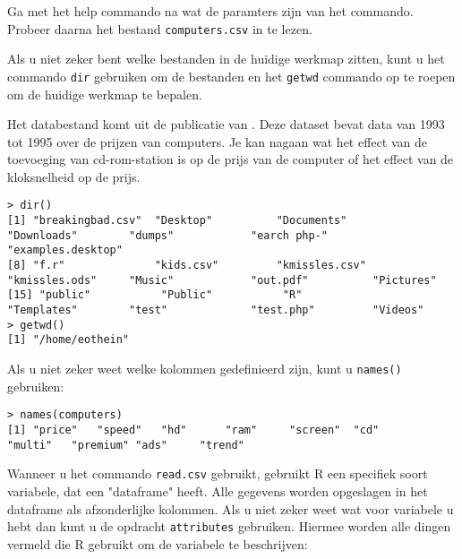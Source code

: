\begin{exercise}
	Ga met het help commando na wat de paramters zijn van het commando. Probeer daarna het bestand \texttt{computers.csv} in te lezen. 
\end{exercise}

Als u niet zeker bent welke bestanden in de huidige werkmap zitten, kunt u het commando \texttt{dir}  gebruiken om de bestanden en het  \texttt{getwd} commando op te roepen om de huidige werkmap te bepalen.

Het databestand komt uit de publicatie van \autocite{Stengos2005}. Deze dataset bevat data van 1993 tot 1995 over de prijzen van computers. Je kan nagaan wat het effect van de toevoeging van cd-rom-station is op de prijs van de computer of  het effect van de kloksnelheid op de prijs. 

\begin{lstlisting}
> dir()
[1] "breakingbad.csv"  "Desktop"          "Documents"        "Downloads"        "dumps"            "earch php-"       "examples.desktop"
[8] "f.r"              "kids.csv"         "kmissles.csv"     "kmissles.ods"     "Music"            "out.pdf"          "Pictures"        
[15] "public"           "Public"           "R"                "Templates"        "test"             "test.php"         "Videos"          
> getwd()
[1] "/home/eothein"
\end{lstlisting}
Als u niet zeker weet welke kolommen gedefinieerd zijn, kunt u  \texttt{names()} gebruiken:


\begin{lstlisting}
> names(computers)
[1] "price"   "speed"   "hd"      "ram"     "screen"  "cd"      "multi"   "premium" "ads"     "trend"
\end{lstlisting}

 Wanneer u het commando \texttt{read.csv} gebruikt, gebruikt R een specifiek soort variabele, dat een "dataframe" heeft. Alle gegevens worden opgeslagen in het dataframe als afzonderlijke kolommen. Als u niet zeker weet wat voor variabele u hebt dan kunt u de opdracht \texttt{attributes} gebruiken. Hiermee worden alle dingen vermeld die R gebruikt om de variabele te beschrijven:

